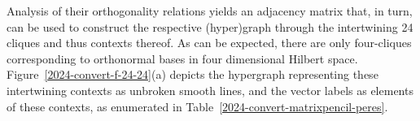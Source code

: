 \documentclass[
  twocolumn,
 showpacs,
 showkeys,
 preprintnumbers,
 amsmath,amssymb,
 aps,
 pra,
  longbibliography,
 floatfix,
 ]{revtex4-2}
\begin{document}

Analysis of their orthogonality relations yields an adjacency matrix that, in turn,
can be used to construct the respective  (hyper)graph through the intertwining 24 cliques and thus contexts thereof.
As can be expected, there are only four-cliques corresponding to orthonormal bases in four dimensional Hilbert space.
Figure~\ref{2024-convert-f-24-24}(a) depicts the hypergraph representing these intertwining contexts as unbroken smooth lines,
 and the vector labels as elements of these contexts,
as enumerated in Table~\ref{2024-convert-matrixpencil-peres}.
\end{document}
